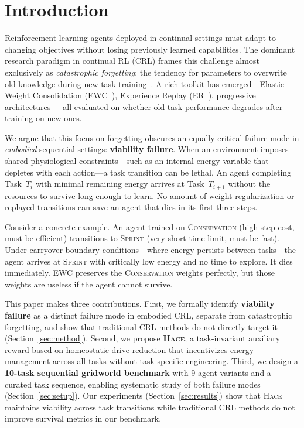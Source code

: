 \documentclass[sigplan,10pt]{acmart}
\newcommand{\hace}{\textsc{Hace}}
\begin{document}
\maketitle

\section{Introduction}
\label{sec:intro}

Reinforcement learning agents deployed in continual settings must adapt to
changing objectives without losing previously learned capabilities.  The
dominant research paradigm in continual RL (CRL) frames this challenge
almost exclusively as \emph{catastrophic forgetting}: the tendency for
parameters to overwrite old knowledge during new-task
training~\cite{Parisi2019,kirkpatrick2017,continualworld2021}.  A rich
toolkit has emerged---Elastic Weight Consolidation (EWC~\cite{kirkpatrick2017}),
Experience Replay (ER~\cite{rolnick2019}), progressive
architectures~\cite{rusu2016}---all evaluated on whether old-task
performance degrades after training on new ones.

We argue that this focus on forgetting obscures an equally critical failure
mode in \emph{embodied} sequential settings: \textbf{viability failure}.
When an environment imposes shared physiological constraints---such as an
internal energy variable that depletes with each action---a task transition
can be lethal.  An agent completing Task~$T_i$ with minimal remaining
energy arrives at Task~$T_{i+1}$ without the resources to survive long
enough to learn.  No amount of weight regularization or replayed
transitions can save an agent that dies in its first three steps.

Consider a concrete example.  An agent trained on \textsc{Conservation}
(high step cost, must be efficient) transitions to \textsc{Sprint}
(very short time limit, must be fast).  Under carryover boundary
conditions---where energy persists between tasks---the agent arrives at
\textsc{Sprint} with critically low energy and no time to explore.  It
dies immediately.  EWC preserves the \textsc{Conservation} weights
perfectly, but those weights are useless if the agent cannot survive.

This paper makes three contributions.  First, we formally identify
\textbf{viability failure} as a distinct failure mode in embodied CRL,
separate from catastrophic forgetting, and show that traditional CRL
methods do not directly target it (Section~\ref{sec:method}).  Second, we
propose \textbf{\hace{}}, a task-invariant auxiliary reward based on
homeostatic drive reduction that incentivizes energy management across all
tasks without task-specific engineering.  Third, we design a
\textbf{10-task sequential gridworld benchmark} with 9 agent variants and
a curated task sequence, enabling systematic study of both failure modes
(Section~\ref{sec:setup}).  Our experiments (Section~\ref{sec:results})
show that \hace{} maintains viability across task transitions while
traditional CRL methods do not improve survival metrics in our benchmark.
\end{document}
